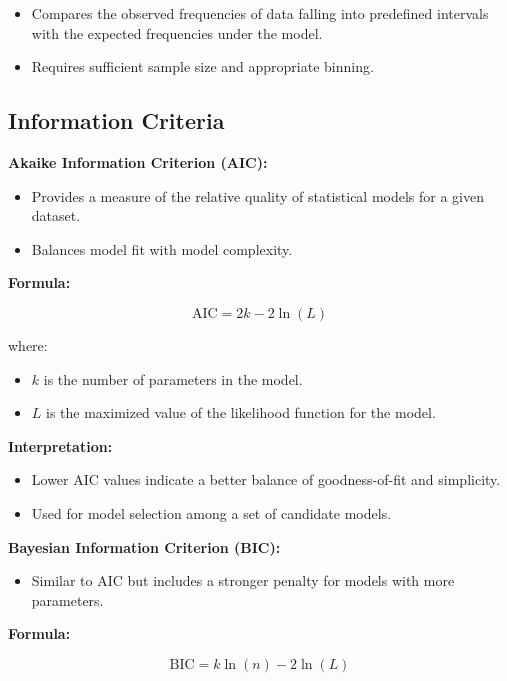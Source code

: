 \documentclass{article}
\begin{document}
\begin{itemize}
    \item Compares the observed frequencies of data falling into predefined intervals with the expected frequencies under the model.
    \item Requires sufficient sample size and appropriate binning.
\end{itemize}

\subsection{Information Criteria}

\textbf{Akaike Information Criterion (AIC):}

\begin{itemize}
    \item Provides a measure of the relative quality of statistical models for a given dataset.
    \item Balances model fit with model complexity.
\end{itemize}

\textbf{Formula:}

\[
\text{AIC} = 2k - 2\ln(L)
\]

where:

\begin{itemize}
    \item $k$ is the number of parameters in the model.
    \item $L$ is the maximized value of the likelihood function for the model.
\end{itemize}

\textbf{Interpretation:}

\begin{itemize}
    \item Lower AIC values indicate a better balance of goodness-of-fit and simplicity.
    \item Used for model selection among a set of candidate models.
\end{itemize}

\textbf{Bayesian Information Criterion (BIC):}

\begin{itemize}
    \item Similar to AIC but includes a stronger penalty for models with more parameters.
\end{itemize}

\textbf{Formula:}

\[
\text{BIC} = k \ln(n) - 2\ln(L)
\]
\end{document}
